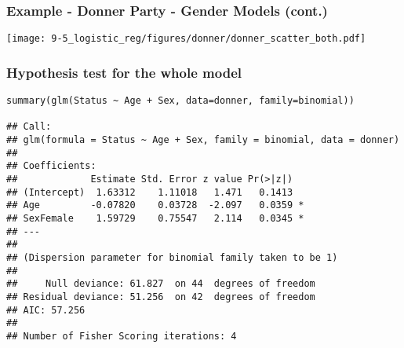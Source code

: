 
\begin{frame}
\frametitle{Example - Donner Party - Gender Models (cont.)}

\begin{center}
\texttt{[image: 9-5\_logistic\_reg/figures/donner/donner\_scatter\_both.pdf]}
\end{center}

\end{frame}



\begin{frame}
\frametitle{Hypothesis test for the whole model}
\vspace{-3mm}
{\scriptsize
\begin{verbatim}
summary(glm(Status ~ Age + Sex, data=donner, family=binomial))

## Call:
## glm(formula = Status ~ Age + Sex, family = binomial, data = donner)
## 
## Coefficients:
##             Estimate Std. Error z value Pr(>|z|)  
## (Intercept)  1.63312    1.11018   1.471   0.1413  
## Age         -0.07820    0.03728  -2.097   0.0359 *
## SexFemale    1.59729    0.75547   2.114   0.0345 *
## ---
## 
## (Dispersion parameter for binomial family taken to be 1)
## 
##     Null deviance: 61.827  on 44  degrees of freedom
## Residual deviance: 51.256  on 42  degrees of freedom
## AIC: 57.256
## 
## Number of Fisher Scoring iterations: 4
\end{verbatim}
}

\pause


\end{frame}


